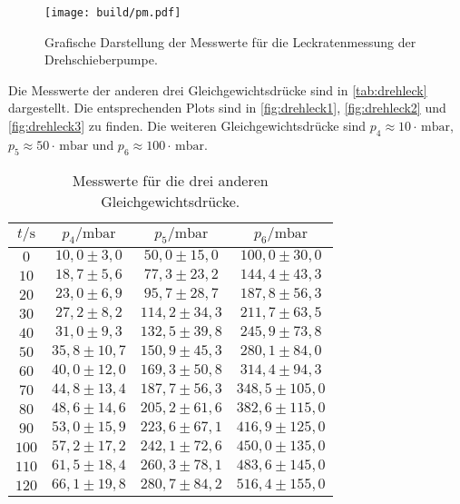 \begin{figure}[H]
  \centering
  \texttt{[image: build/pm.pdf]}
  \caption{Grafische Darstellung der Messwerte für die Leckratenmessung der Drehschieberpumpe.}
  \label{fig:pm}
\end{figure}

Die Messwerte der anderen drei Gleichgewichtsdrücke sind in \autoref{tab:drehleck} dargestellt. Die entsprechenden
Plots sind in \autoref{fig:drehleck1}, \autoref{fig:drehleck2} und \autoref{fig:drehleck3} zu finden.
Die weiteren Gleichgewichtsdrücke sind
$p_4 \approx 10 \cdot \,\si{\milli\bar}$, $p_5 \approx 50 \cdot \,\si{\milli\bar}$ und
$p_6 \approx 100 \cdot \,\si{\milli\bar}$.

\begin{table}[H]
  \centering
  \caption{Messwerte für die drei anderen Gleichgewichtsdrücke.}
  \label{tab:drehleck}
  \begin{tabular}{c c c c}
    \toprule
    $t/\si{\second}$ & $p_4 /\si{\milli\bar}$ & $p_5 /\si{\milli\bar}$ & $p_6 /\si{\milli\bar}$ \\
    \midrule
    $  0$ & $ 10,0 \pm  3,0 $ & $  50,0 \pm  15,0 $ & $ 100,0 \pm  30,0 $ \\ 
    $ 10$ & $ 18,7 \pm  5,6 $ & $  77,3 \pm  23,2 $ & $ 144,4 \pm  43,3 $ \\ 
    $ 20$ & $ 23,0 \pm  6,9 $ & $  95,7 \pm  28,7 $ & $ 187,8 \pm  56,3 $ \\ 
    $ 30$ & $ 27,2 \pm  8,2 $ & $ 114,2 \pm  34,3 $ & $ 211,7 \pm  63,5 $ \\ 
    $ 40$ & $ 31,0 \pm  9,3 $ & $ 132,5 \pm  39,8 $ & $ 245,9 \pm  73,8 $ \\ 
    $ 50$ & $ 35,8 \pm 10,7 $ & $ 150,9 \pm  45,3 $ & $ 280,1 \pm  84,0 $ \\ 
    $ 60$ & $ 40,0 \pm 12,0 $ & $ 169,3 \pm  50,8 $ & $ 314,4 \pm  94,3 $ \\ 
    $ 70$ & $ 44,8 \pm 13,4 $ & $ 187,7 \pm  56,3 $ & $ 348,5 \pm 105,0 $ \\ 
    $ 80$ & $ 48,6 \pm 14,6 $ & $ 205,2 \pm  61,6 $ & $ 382,6 \pm 115,0 $ \\ 
    $ 90$ & $ 53,0 \pm 15,9 $ & $ 223,6 \pm  67,1 $ & $ 416,9 \pm 125,0 $ \\ 
    $100$ & $ 57,2 \pm 17,2 $ & $ 242,1 \pm  72,6 $ & $ 450,0 \pm 135,0 $ \\ 
    $110$ & $ 61,5 \pm 18,4 $ & $ 260,3 \pm  78,1 $ & $ 483,6 \pm 145,0 $ \\ 
    $120$ & $ 66,1 \pm 19,8 $ & $ 280,7 \pm  84,2 $ & $ 516,4 \pm 155,0 $ \\ 

\end{tabular}
\end{table}
